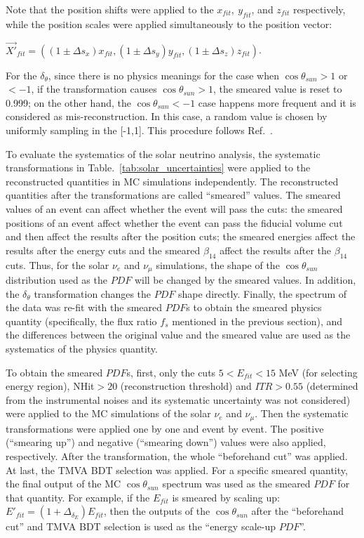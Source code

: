 Note that the position shifts were applied to the $x_{fit},~y_{fit}$, and $z_{fit}$ respectively, while the position scales were applied simultaneously to the position vector: 

$\vec{X'}_{fit}=((1\pm \Delta s_x)x_{fit},(1\pm \Delta s_y)y_{fit},(1\pm \Delta s_z)z_{fit})$.

For the $\delta_\theta$, since there is no physics meanings for the case when $\cos\theta_{sun}>1$ or $<-1$, if the transformation causes $\cos\theta_{sun}>1$, the smeared value is reset to 0.999; on the other hand, the $\cos\theta_{sun}<-1$ case happens more frequent and it is considered as mis-reconstruction. In this case, a random value is chosen by uniformly sampling in the [-1,1]. This procedure follows Ref.~\cite{waterunidoc}.

To evaluate the systematics of the solar neutrino analysis, the systematic transformations in Table.~\ref{tab:solar_uncertainties} were applied to the reconstructed quantities in MC simulations independently. The reconstructed quantities after the transformations are called ``smeared'' values. The smeared values of an event can affect whether the event will pass the cuts: the smeared positions of an event affect whether the event can pass the fiducial volume cut and then affect the results after the position cuts; the smeared energies affect the results after the energy cuts and the smeared $\beta_{14}$ affect the results after the $\beta_{14}$ cuts. Thus, for the solar $\nu_e$ and $\nu_\mu$ simulations, the shape of the $\cos\theta_{sun}$ distribution used as the $PDF$ will be changed by the smeared values. In addition, the $\delta_\theta$ transformation changes the $PDF$ shape directly. Finally, the spectrum of the data was re-fit with the smeared $PDF$s to obtain the smeared physics quantity (specifically, the flux ratio $f_s$ mentioned in the previous section), and the differences between the original value and the smeared value are used as the systematics of the physics quantity.

To obtain the smeared $PDF$s, first, only the cuts $5<E_{fit}<15$ MeV (for selecting energy region), NHit$>20$ (reconstruction threshold) and $ITR>0.55$ (determined from the instrumental noises and its systematic uncertainty was not considered) were applied to the MC simulations of the solar $\nu_e$ and $\nu_\mu$. Then the systematic transformations were applied one by one and event by event. The positive (``smearing up'') and negative (``smearing down'') values were also applied, respectively. After the transformation, the whole ``beforehand cut'' was applied. At last, the TMVA BDT selection was applied. For a specific smeared quantity, the final output of the MC $\cos\theta_{sun}$ spectrum was used as the smeared $PDF$ for that quantity. For example, if the $E_{fit}$ is smeared by scaling up: $E'_{fit}=(1+\Delta_{\delta_E})E_{fit}$, then the outputs of the $\cos\theta_{sun}$ after the ``beforehand cut'' and TMVA BDT selection is used as the ``energy scale-up $PDF$''.

